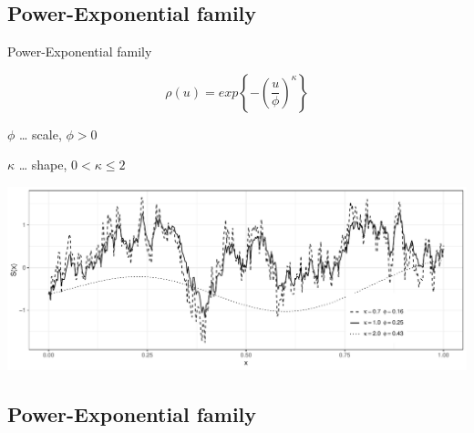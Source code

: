 \documentclass[
  ignorenonframetext,
]{beamer}
\begin{document}
\hypertarget{power-exponential-family-1}{%
\subsection{Power-Exponential family}\label{power-exponential-family-1}}

\begin{frame}{Power-Exponential family}
\large

\[\rho(u)=exp\left\{-\left(\frac{u}{\phi}\right)^\kappa\right\}\]

\small

\(\phi\) \ldots{} scale, \(\phi>0\)

\(\kappa\) \ldots{} shape, \(0<\kappa\le 2\)

\includegraphics{Lecture_1_files/figure-beamer/unnamed-chunk-10-1.pdf}
\end{frame}

\hypertarget{power-exponential-family-2}{%
\subsection{Power-Exponential family}\label{power-exponential-family-2}}
\end{document}
